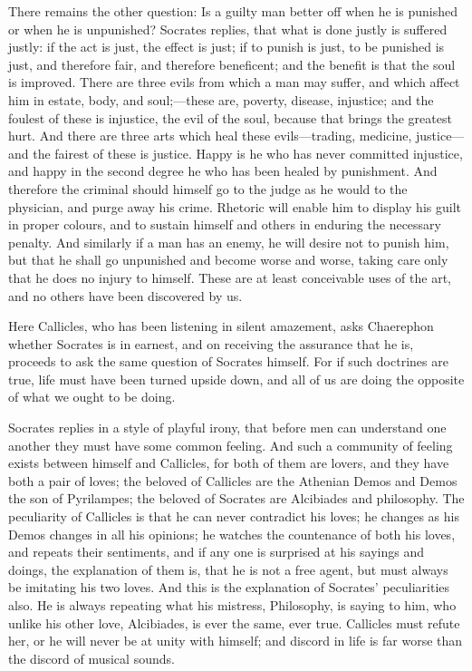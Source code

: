 \documentclass[11pt,letter]{article}
\begin{document}
\par  There remains the other question: Is a guilty man better off when he is punished or when he is unpunished? Socrates replies, that what is done justly is suffered justly: if the act is just, the effect is just; if to punish is just, to be punished is just, and therefore fair, and therefore beneficent; and the benefit is that the soul is improved. There are three evils from which a man may suffer, and which affect him in estate, body, and soul;—these are, poverty, disease, injustice; and the foulest of these is injustice, the evil of the soul, because that brings the greatest hurt. And there are three arts which heal these evils—trading, medicine, justice—and the fairest of these is justice. Happy is he who has never committed injustice, and happy in the second degree he who has been healed by punishment. And therefore the criminal should himself go to the judge as he would to the physician, and purge away his crime. Rhetoric will enable him to display his guilt in proper colours, and to sustain himself and others in enduring the necessary penalty. And similarly if a man has an enemy, he will desire not to punish him, but that he shall go unpunished and become worse and worse, taking care only that he does no injury to himself. These are at least conceivable uses of the art, and no others have been discovered by us.

\par  Here Callicles, who has been listening in silent amazement, asks Chaerephon whether Socrates is in earnest, and on receiving the assurance that he is, proceeds to ask the same question of Socrates himself. For if such doctrines are true, life must have been turned upside down, and all of us are doing the opposite of what we ought to be doing.

\par  Socrates replies in a style of playful irony, that before men can understand one another they must have some common feeling. And such a community of feeling exists between himself and Callicles, for both of them are lovers, and they have both a pair of loves; the beloved of Callicles are the Athenian Demos and Demos the son of Pyrilampes; the beloved of Socrates are Alcibiades and philosophy. The peculiarity of Callicles is that he can never contradict his loves; he changes as his Demos changes in all his opinions; he watches the countenance of both his loves, and repeats their sentiments, and if any one is surprised at his sayings and doings, the explanation of them is, that he is not a free agent, but must always be imitating his two loves. And this is the explanation of Socrates’ peculiarities also. He is always repeating what his mistress, Philosophy, is saying to him, who unlike his other love, Alcibiades, is ever the same, ever true. Callicles must refute her, or he will never be at unity with himself; and discord in life is far worse than the discord of musical sounds.
\end{document}
